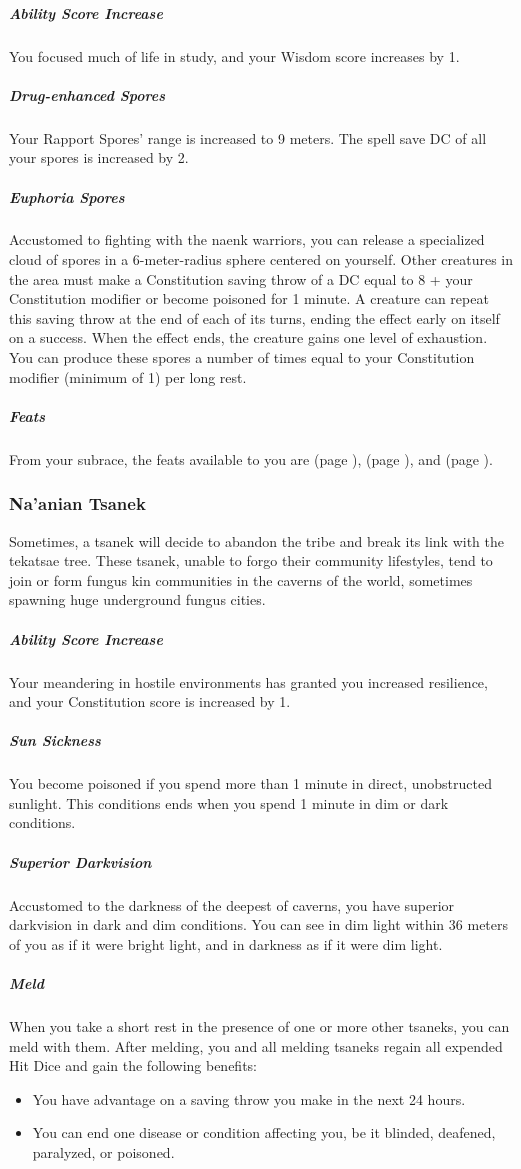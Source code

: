     \subparagraph{Ability Score Increase} You focused much of life in study, and your Wisdom score increases by 1.

    \subparagraph{Drug-enhanced Spores} Your Rapport Spores' range is increased to 9 meters.
    The spell save DC of all your spores is increased by 2.

    \subparagraph{Euphoria Spores} Accustomed to fighting with the naenk warriors, you can release a specialized cloud of spores in a 6-meter-radius sphere centered on yourself.
    Other creatures in the area must make a Constitution saving throw of a DC equal to 8 + your Constitution modifier or become poisoned for 1 minute.
    A creature can repeat this saving throw at the end of each of its turns, ending the effect early on itself on a success.
    When the effect ends, the creature gains one level of exhaustion.
    You can produce these spores a number of times equal to your Constitution modifier (minimum of 1) per long rest.

    \subparagraph{Feats} From your subrace, the feats available to you are
    \textbf{} (page \pageref{feat::}),
    \textbf{} (page \pageref{feat::}), and
    \textbf{} (page \pageref{feat::}).

\subsubsection{Na'anian Tsanek}
    Sometimes, a tsanek will decide to abandon the tribe and break its link with the tekatsae tree.
    These tsanek, unable to forgo their community lifestyles, tend to join or form fungus kin communities in the caverns of the world, sometimes spawning huge underground fungus cities.

    \subparagraph{Ability Score Increase} Your meandering in hostile environments has granted you increased resilience, and your Constitution score is increased by 1.

    \subparagraph{Sun Sickness} You become poisoned if you spend more than 1 minute in direct, unobstructed sunlight.
    This conditions ends when you spend 1 minute in dim or dark conditions.

    \subparagraph{Superior Darkvision} Accustomed to the darkness of the deepest of caverns, you have superior darkvision in dark and dim conditions.
    You can see in dim light within 36 meters of you as if it were bright light, and in darkness as if it were dim light.

    \subparagraph{Meld} When you take a short rest in the presence of one or more other tsaneks, you can meld with them.
    After melding, you and all melding tsaneks regain all expended Hit Dice and gain the following benefits:
    \begin{itemize}
        \item You have advantage on a saving throw you make in the next 24 hours.
        \item You can end one disease or condition affecting you, be it blinded, deafened, paralyzed, or poisoned.
    \end{itemize}

